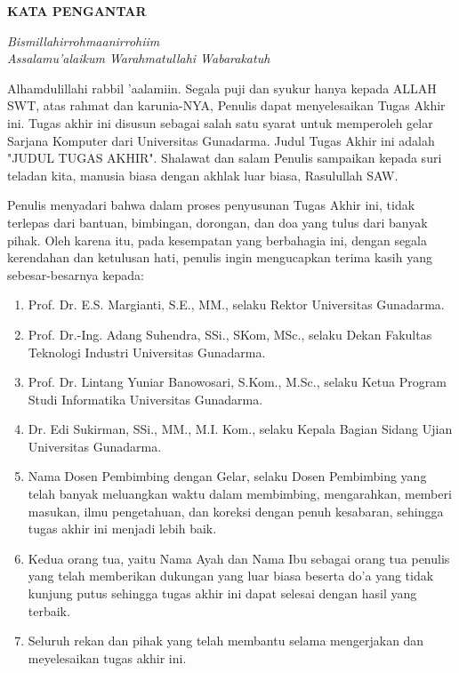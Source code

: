\newpage %
\begin{center}
\begin{large}\textbf{KATA PENGANTAR}\\\end{large}
\end{center}
\vspace{5mm}
\textit{Bismillahirrohmaanirrohiim} \\
\textit{Assalamu'alaikum Warahmatullahi Wabarakatuh}

Alhamdulillahi rabbil 'aalamiin. Segala puji dan syukur hanya kepada ALLAH SWT, atas rahmat dan karunia-NYA, Penulis dapat menyelesaikan Tugas Akhir ini. Tugas akhir ini disusun sebagai salah satu syarat untuk memperoleh gelar Sarjana Komputer dari Universitas Gunadarma. Judul Tugas Akhir ini adalah "JUDUL TUGAS AKHIR". Shalawat dan salam Penulis sampaikan kepada suri teladan kita, manusia biasa dengan akhlak luar biasa, Rasulullah SAW.

Penulis menyadari bahwa dalam proses penyusunan Tugas Akhir ini, tidak terlepas dari bantuan, bimbingan, dorongan, dan doa yang tulus dari banyak pihak. Oleh karena itu, pada kesempatan yang berbahagia ini, dengan segala kerendahan dan ketulusan hati, penulis ingin mengucapkan terima kasih yang sebesar-besarnya kepada:


\begin{enumerate}
\item Prof. Dr. E.S. Margianti, S.E., MM.,  selaku Rektor Universitas Gunadarma.
\item Prof. Dr.-Ing. Adang Suhendra, SSi., SKom, MSc., selaku Dekan Fakultas Teknologi Industri Universitas Gunadarma.
\item Prof. Dr. Lintang Yuniar Banowosari, S.Kom., M.Sc., selaku Ketua Program Studi Informatika Universitas Gunadarma.
\item Dr. Edi Sukirman, SSi., MM., M.I. Kom., selaku Kepala Bagian Sidang Ujian Universitas Gunadarma.
\item Nama Dosen Pembimbing dengan Gelar, selaku Dosen Pembimbing yang telah banyak meluangkan waktu dalam membimbing, mengarahkan, memberi masukan, ilmu pengetahuan, dan koreksi dengan penuh kesabaran, sehingga tugas akhir ini menjadi lebih baik.
\item Kedua orang tua, yaitu Nama Ayah dan Nama Ibu sebagai orang tua penulis yang telah memberikan dukungan yang luar biasa beserta do'a yang tidak kunjung putus sehingga tugas akhir ini dapat selesai dengan hasil yang terbaik.
\item Seluruh rekan dan pihak yang telah membantu selama mengerjakan dan meyelesaikan tugas akhir ini.
\end{enumerate}

